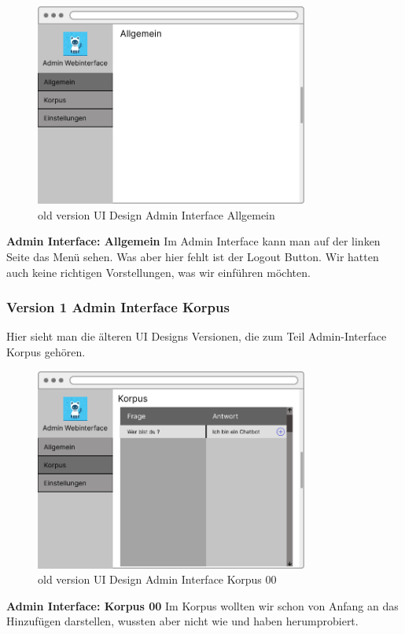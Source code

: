 \begin{figure}[H]
    \centering
    \includegraphics[width=0.8\textwidth]{bilder/old vers. UI Design/Admin Interface Allgemein.png}
    \caption{old version UI Design Admin Interface Allgemein}
    \label{fig:old version UI Design Admin Interface Allgemein}
    \end{figure}
\noindent \textbf{Admin Interface: Allgemein} \newline
Im Admin Interface kann man auf der linken Seite das Menü sehen. Was aber hier fehlt ist der Logout Button.
Wir hatten auch keine richtigen Vorstellungen, was wir einführen möchten.

\newpage

\subsubsection{Version 1 Admin Interface Korpus}
Hier sieht man die älteren UI Designs Versionen, die zum Teil Admin-Interface Korpus gehören.

\begin{figure}[H]
    \centering
    \includegraphics[width=0.8\textwidth]{bilder/old vers. UI Design/Admin Interface (1).png}
    \caption{old version UI Design Admin Interface Korpus 00}
    \label{fig:old version UI Design Admin Interface Korpus 00}
    \end{figure}
\noindent \textbf{Admin Interface: Korpus 00} \newline
Im Korpus wollten wir schon von Anfang an das Hinzufügen darstellen, wussten aber nicht
wie und haben herumprobiert.

